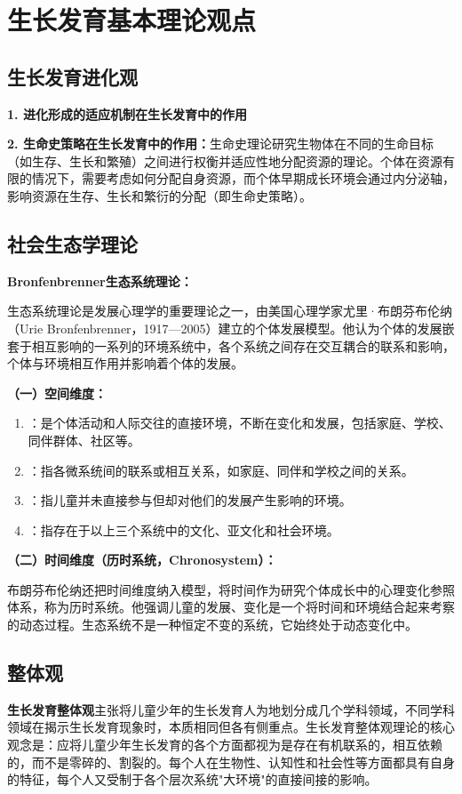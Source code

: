 \section{生长发育基本理论观点}

\subsection{生长发育进化观}

\begin{defbox}
\textbf{1. 进化形成的适应机制在生长发育中的作用}

\textbf{2. 生命史策略在生长发育中的作用：}生命史理论研究生物体在不同的生命目标（如生存、生长和繁殖）之间进行权衡并适应性地分配资源的理论。个体在资源有限的情况下，需要考虑如何分配自身资源，而个体早期成长环境会通过内分泌轴，影响资源在生存、生长和繁衍的分配（即生命史策略）。
\end{defbox}

\subsection{社会生态学理论}

\begin{keybox}
\textbf{Bronfenbrenner生态系统理论：}

生态系统理论是发展心理学的重要理论之一，由美国心理学家尤里·布朗芬布伦纳（Urie Bronfenbrenner，1917—2005）建立的个体发展模型。他认为个体的发展嵌套于相互影响的一系列的环境系统中，各个系统之间存在交互耦合的联系和影响，个体与环境相互作用并影响着个体的发展。

\textbf{（一）空间维度：}
\begin{enumerate}[leftmargin=*]
    \item {}：是个体活动和人际交往的直接环境，不断在变化和发展，包括家庭、学校、同伴群体、社区等。
    \item {}：指各微系统间的联系或相互关系，如家庭、同伴和学校之间的关系。
    \item {}：指儿童并未直接参与但却对他们的发展产生影响的环境。
    \item {}：指存在于以上三个系统中的文化、亚文化和社会环境。
\end{enumerate}

\textbf{（二）时间维度（历时系统，Chronosystem）：}

布朗芬布伦纳还把时间维度纳入模型，将时间作为研究个体成长中的心理变化参照体系，称为历时系统。他强调儿童的发展、变化是一个将时间和环境结合起来考察的动态过程。生态系统不是一种恒定不变的系统，它始终处于动态变化中。
\end{keybox}

\subsection{整体观}

\begin{defbox}
\textbf{生长发育整体观}主张将儿童少年的生长发育人为地划分成几个学科领域，不同学科领域在揭示生长发育现象时，本质相同但各有侧重点。生长发育整体观理论的核心观念是：应将儿童少年生长发育的各个方面都视为是存在有机联系的，相互依赖的，而不是零碎的、割裂的。每个人在生物性、认知性和社会性等方面都具有自身的特征，每个人又受制于各个层次系统"大环境"的直接间接的影响。
\end{defbox}

\newpage
